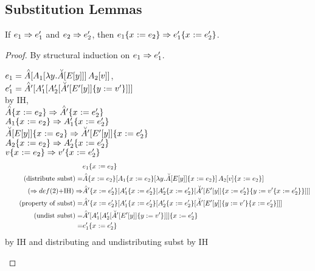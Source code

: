\documentclass{article}
\begin{document}
%
%

\subsection{Substitution Lemmas}

\newcommand{\substxetwo}[2][]{\substx{#2}{e_2#1}}
\begin{lemma}[Substitution]
\label{lem:subst}
  If $\e_1 \pstep \e_1'$ and $\e_2 \pstep \e_2'$, then $\substxetwo{\e_1}
  \pstep \substxetwo[']{\e_1'}$.
\end{lemma}

\begin{proof}
By structural induction on $\e_1 \pstep \e_1'$.
\begin{byCases}
  $\e_1 = \inAp{\ap{ \inA[_1]{\ly\inAm{\Ey}} }
                  { \Av[_2] }}$, \\
  $\e_1' = \inAp[']{\inA[_1']{\inA[_2']{\substy{\inAm[']{\Ey[']}}{\val'}}}}$ \\
  by IH, \\
  $\substxetwo{\Ap} \pstep \substxetwo[']{\Ap'}$ \\
  $\substxetwo{\A_1} \pstep \substxetwo[']{\A_1'}$ \\
  $\substxetwo{\inAm{\Ey}} \pstep \substxetwo[']{\inAm[']{\Ey[']}}$ \\
  $\substxetwo{\A_2} \pstep \substxetwo[']{\A_2'}$ \\
  $\substxetwo{\val} \pstep \substxetwo[']{\val'}$
  \begin{align*}
    &\substx{\e_1}{\e_2} \\
    \tag{distribute subst}
    = &\inhole{\substxetwo{\Ap}}
              {\ap{ \inhole{\substxetwo{\A_1}}
                           {\substxetwo{\ly\inAm{\Ey}}} }
                  { \substxetwo{\Av[_2]} }} \\
    \tag{$\pstep def(2)$+IH}
\pstep&\inhole{\substxetwo[']{\Ap'}}
      {\inhole{\substxetwo[']{\A_1'}}
      {\inhole{\substxetwo[']{\A_2'}}
              {\substy{\substxetwo[']{\inAm[']{\Ey[']}}}
                      {\substxetwo[']{\val'}}}}} \\
    \tag{property of subst}
    = &\inhole{\substxetwo[']{\Ap'}}
      {\inhole{\substxetwo[']{\A_1'}}
      {\inhole{\substxetwo[']{\A_2'}}
              {\substxetwo[']{\substy{\inAm[']{\Ey[']}}{\val'}}}}} \\
    \tag{undist subst}
    = &\substxetwo[']{
         \inAp[']{\inA[_1']{\inA[_2']{\substy{\inAm[']{\Ey[']}}{\val'}}}}} \\
    = &\substxetwo[']{\e_1'}
  \end{align*}
  by IH and distributing and undistributing subst
  by IH
\end{byCases}
\end{proof}
\end{document}
